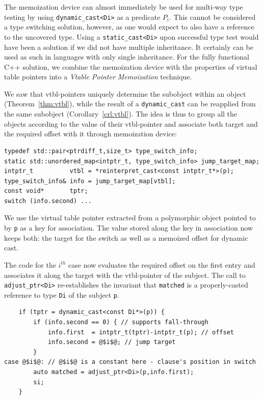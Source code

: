 \documentclass[preprint]{sigplanconf}
\makeatletter
\DeclareRobustCommand{\code}[1]{{\lstinline[breaklines=false,escapechar=@]{#1}}}
\makeatother
\begin{document}
The memoization device can almost immediately be used for multi-way type testing by 
using \code{dynamic_cast<Di>} as a predicate $P_i$. This cannot be considered a 
type switching solution, however, as one would expect to also have a reference 
to the uncovered type. Using a \code{static_cast<Di>} upon successful type test 
would have been a solution if we did not have multiple inheritance. It certainly 
can be used as such in languages with only single inheritance. For the fully 
functional C++ solution, we combine the memoization device with the properties 
of virtual table pointers into a \emph{Vtable Pointer Memoization} technique.

We saw that vtbl-pointers uniquely determine the subobject within an object 
(Theorem~\ref{thm:vtbl}), while the result of a \code{dynamic_cast} can be reapplied 
from the same subobject (Corollary~\ref{crl:vtbl}). The idea is thus to group 
all the objects according to the value of their vtbl-pointer and associate both 
target and the required offset with it through memoization device:

\begin{lstlisting}
typedef std::pair<ptrdiff_t,size_t> type_switch_info;
static std::unordered_map<intptr_t, type_switch_info> jump_target_map;
intptr_t          vtbl = *reinterpret_cast<const intptr_t*>(p);
type_switch_info& info = jump_target_map[vtbl];
const void*       tptr; 
switch (info.second) ...
\end{lstlisting}

\noindent
We use the virtual table pointer extracted from a polymorphic object pointed to 
by \code{p} as a key for association. The value stored along the key in 
association now keeps both: the target for the switch as well as a memoized 
offset for dynamic cast. 

The code for the $i^{th}$ case now evaluates the required offset on the first 
entry and associates it along the target with the vtbl-pointer of the subject.
The call to \code{adjust_ptr<Di>} re-establishes the invariant that 
\code{matched} is a properly-casted reference to type \code{Di} of the subject 
\code{p}.

\begin{lstlisting}
    if (tptr = dynamic_cast<const Di*>(p)) {
        if (info.second == 0) { // supports fall-through
            info.first  = intptr_t(tptr)-intptr_t(p); // offset
            info.second = @$i$@; // jump target
        }
case @$i$@: // @$i$@ is a constant here - clause's position in switch
        auto matched = adjust_ptr<Di>(p,info.first); 
        si;
    }
\end{lstlisting}
\end{document}
